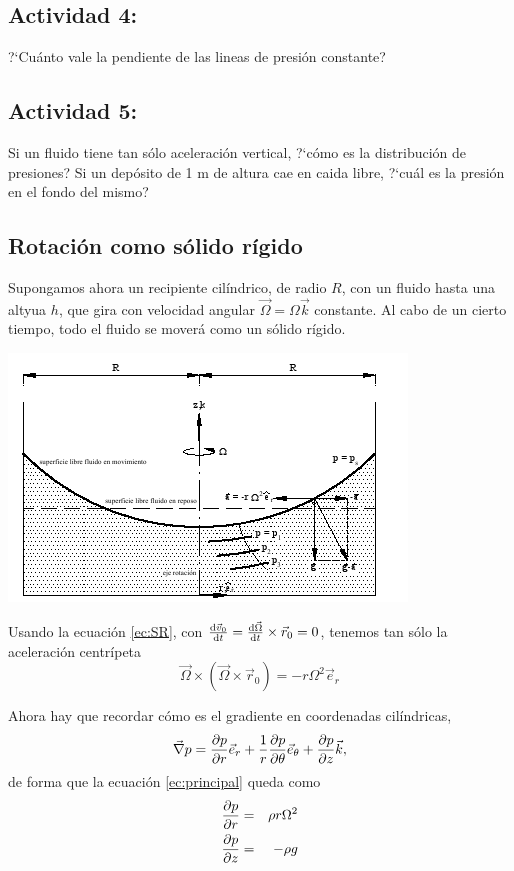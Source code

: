 \subsection*{Actividad 4:} ?`Cuánto vale la pendiente de las lineas de presión constante?

\subsection*{Actividad 5:} Si un fluido tiene tan sólo aceleración vertical, ?`cómo es la distribución de presiones? Si un depósito de 1 m de altura cae en caida libre, ?`cuál es la presión en el fondo del mismo?

\subsection{Rotación como sólido rígido}

Supongamos ahora un recipiente cilíndrico, de radio $R$, con un fluido hasta una altyua $h$, que gira con velocidad angular $\vec \Omega = \Omega \vec k$ constante. Al cabo de un cierto tiempo, todo el fluido se moverá como un sólido rígido.

\begin{center}
	\includegraphics[width=0.7\columnwidth]{TeX_files/chapter02-Hidrostatica/ac_centripeta}
\end{center}

Usando la ecuación \ref{ec:SR}, con $\frac{\textrm{d} \vec v_0}{\textrm{d} t} = \frac{\textrm{d} \vec \Omega}{\textrm{d} t} \times \vec r_0 =0$, tenemos tan sólo la aceleración centrípeta
\begin{equation}
	\vec \Omega \times \left( \vec \Omega \times \vec r_0\right) = -r\Omega^2 \vec e_r
\end{equation} 


Ahora hay que recordar cómo es el gradiente en coordenadas cilíndricas,
\begin{equation}
	\vec \nabla p = \frac{\partial p}{\partial r} \vec e_r + \frac{1}{r}\frac{\partial p}{\partial \theta}\vec e_\theta + \frac{\partial p}{\partial z}\vec k,
\end{equation} 
de forma que la ecuación \ref{ec:principal} queda como
\begin{eqnarray}
	\frac{\partial p}{\partial r} &=& \rho r\Omega^2 \\
	\frac{\partial p}{\partial z} &=& -\rho g
\end{eqnarray} 

